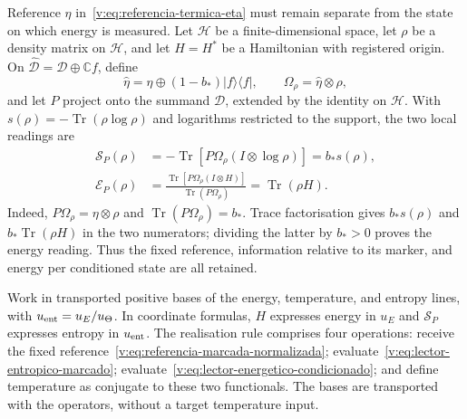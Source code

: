Reference $\eta$ in~\eqref{v:eq:referencia-termica-eta} must remain
separate from the state on which energy is measured. Let $\mathcal H$ be a
finite-dimensional space, let $\rho$ be a density matrix on $\mathcal H$,
and let $H=H^*$ be a Hamiltonian with registered origin. On
$\widehat{\mathcal D}=\mathcal D\oplus\mathbb C f$, define
\begin{equation}
 \widehat\eta=\eta\oplus(1-b_*)|f\rangle\langle f|,
 \qquad \Omega_\rho=\widehat\eta\otimes\rho,
 \label{v:eq:referencia-marcada-normalizada}
\end{equation}
and let $P$ project onto the summand $\mathcal D$, extended by the identity
on $\mathcal H$. With
$s(\rho)=-\operatorname{Tr}(\rho\log\rho)$ and logarithms restricted to
the support, the two local readings are
\begin{align}
 \mathcal S_P(\rho)
 &=-\operatorname{Tr}\!\left[P\Omega_\rho
                 (I\otimes\log\rho)\right]
   =b_*s(\rho),\label{v:eq:lector-entropico-marcado}\\
 \mathcal E_P(\rho)
 &=\frac{\operatorname{Tr}\!\left[P\Omega_\rho(I\otimes H)\right]}
         {\operatorname{Tr}(P\Omega_\rho)}
   =\operatorname{Tr}(\rho H).
 \label{v:eq:lector-energetico-condicionado}
\end{align}
Indeed, $P\Omega_\rho=\eta\otimes\rho$ and
$\operatorname{Tr}(P\Omega_\rho)=b_*$. Trace factorisation gives
$b_*s(\rho)$ and $b_*\operatorname{Tr}(\rho H)$ in the two numerators;
dividing the latter by $b_*>0$ proves the energy reading. Thus the fixed
reference, information relative to its marker, and energy per conditioned
state are all retained.

Work in transported positive bases of the energy, temperature, and entropy
lines, with $u_{\rm ent}=u_E/u_\Theta$. In coordinate formulas, $H$ expresses
energy in $u_E$ and $\mathcal S_P$ expresses entropy in $u_{\rm ent}$. The
realisation rule comprises four operations: receive the fixed
reference~\eqref{v:eq:referencia-marcada-normalizada};
evaluate~\eqref{v:eq:lector-entropico-marcado};
evaluate~\eqref{v:eq:lector-energetico-condicionado}; and define temperature
as conjugate to these two functionals. The bases are transported with the
operators, without a target temperature input.

